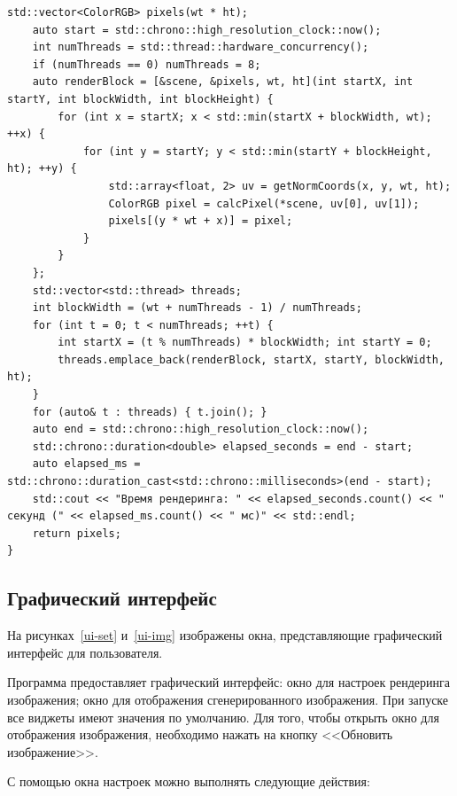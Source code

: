 \begin{lstlisting}[label=alg:3, caption=Реализация класса $Renderer$, captionpos=t]
	std::vector<ColorRGB> pixels(wt * ht); 
	auto start = std::chrono::high_resolution_clock::now();
	int numThreads = std::thread::hardware_concurrency();
	if (numThreads == 0) numThreads = 8;
	auto renderBlock = [&scene, &pixels, wt, ht](int startX, int startY, int blockWidth, int blockHeight) {
		for (int x = startX; x < std::min(startX + blockWidth, wt); ++x) {
			for (int y = startY; y < std::min(startY + blockHeight, ht); ++y) {
				std::array<float, 2> uv = getNormCoords(x, y, wt, ht);
				ColorRGB pixel = calcPixel(*scene, uv[0], uv[1]);
				pixels[(y * wt + x)] = pixel;
			}
		}
	};
	std::vector<std::thread> threads;
	int blockWidth = (wt + numThreads - 1) / numThreads;
	for (int t = 0; t < numThreads; ++t) {
		int startX = (t % numThreads) * blockWidth; int startY = 0;
		threads.emplace_back(renderBlock, startX, startY, blockWidth, ht);
	}
	for (auto& t : threads) { t.join(); }
	auto end = std::chrono::high_resolution_clock::now();
	std::chrono::duration<double> elapsed_seconds = end - start;
	auto elapsed_ms = std::chrono::duration_cast<std::chrono::milliseconds>(end - start); 
	std::cout << "Время рендеринга: " << elapsed_seconds.count() << " секунд (" << elapsed_ms.count() << " мс)" << std::endl;
	return pixels;
}
\end{lstlisting}

\subsection{Графический интерфейс}

На рисунках~\ref{ui-set} и~\ref{ui-img} изображены окна, представляющие графический интерфейс для пользователя.

Программа предоставляет графический интерфейс: окно для настроек рендеринга изображения; окно для отображения сгенерированного изображения. При запуске все виджеты имеют значения по умолчанию. Для того, чтобы открыть окно для отображения изображения, необходимо нажать на кнопку <<Обновить изображение>>. 

С помощью окна настроек можно выполнять следующие действия: 

